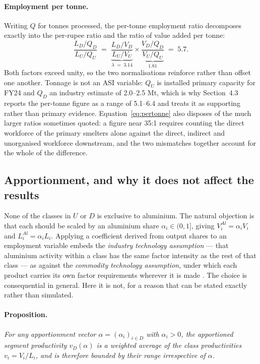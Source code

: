 \paragraph{Employment per tonne.} Writing $Q$ for tonnes processed, the per-tonne
employment ratio decomposes exactly into the per-rupee ratio and the ratio of value
added per tonne:
\begin{equation}
    \frac{L_D/Q_D}{L_U/Q_U}
    \;=\;
    \underbrace{\frac{L_D/V_D}{L_U/V_U}}_{\lambda \;=\; 3.14}
    \times
    \underbrace{\frac{V_D/Q_D}{V_U/Q_U}}_{1.81}
    \;=\; 5.7 .
    \label{eq:pertonne}
\end{equation}
Both factors exceed unity, so the two normalisations reinforce rather than offset one
another. Tonnage is not an ASI variable: $Q_U$ is installed primary capacity for FY24
and $Q_D$ an industry estimate of 2.0--2.5 Mt, which is why Section~4.3 reports the
per-tonne figure as a range of 5.1--6.4 and treats it as supporting rather than
primary evidence. Equation~\eqref{eq:pertonne} also disposes of the much larger
ratios sometimes quoted: a figure near 35:1 requires counting the direct workforce of
the primary smelters alone against the direct, indirect and unorganised workforce
downstream, and the two mismatches together account for the whole of the difference.

\subsection{Apportionment, and why it does not affect the results}
\label{app:asi_alpha}

None of the classes in $U$ or $D$ is exclusive to aluminium. The natural objection
is that each should be scaled by an aluminium share $\alpha_i \in (0,1]$, giving
$V^{Al}_{i} = \alpha_i V_{i}$ and $L^{Al}_{i} = \alpha_i L_{i}$. Applying a
coefficient derived from output shares to an employment variable embeds the
\emph{industry technology assumption} --- that aluminium activity within a class has
the same factor intensity as the rest of that class --- as against the
\emph{commodity technology assumption}, under which each product carries its own
factor requirements wherever it is made \cite{millerblair}. The choice is
consequential in general. Here it is not, for a reason that can be stated exactly
rather than simulated.

\paragraph{Proposition.} \textit{For any apportionment vector
$\alpha = (\alpha_i)_{i \in D}$ with $\alpha_i > 0$, the apportioned segment
productivity $v_D(\alpha)$ is a weighted average of the class productivities
$v_i = V_i / L_i$, and is therefore bounded by their range irrespective of
$\alpha$.}

